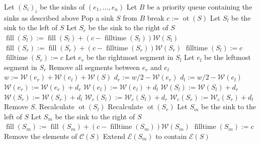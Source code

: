 \documentclass[11pt,a4paper]{article}
\DeclareMathOperator{\ot}{ot}
\DeclareMathOperator{\Fill}{fill}
\DeclareMathOperator{\filltime}{filltime}
\begin{document}
\begin{algorithmic}[1]
    \State Let $(S_i)_i$ be the sinks of $(e_1,\ldots,e_n)$
    \State Let $B$ be a priority queue containing the sinks as described above
     \label{a2:while}
        \State Pop a sink $S$ from $B$  \label{a2:firstline}
        \If{$\ot(S)\ge T$} \label{a2:otget}
            \State break
        \EndIf
        \State $c := \ot(S)$ \label{a2:cupd}
         \label{a2:bleqbr}
            \State Let $S_l$ be the sink to the left of $S$ \label{a2:getsl}
            \State Let $S_r$ be the sink to the right of $S$ \label{a2:getsr}
            \State $\Fill(S_l) := \Fill(S_l) + (c - \filltime(S_l))\mathcal{W}(S_l)$
            \State $\Fill(S_r) := \Fill(S_r) + (c - \filltime(S_r))\mathcal{W}(S_r)$
            \State $\filltime(S_l) := c$
            \State $\filltime(S_r) := c$
            \State Let $e_r$ be the rightmost segment in $S_l$ \label{a2:geter}
            \State Let $e_l$ be the leftmost segment in $S_r$ \label{a2:getel}
            \State Remove all segments between $e_r$ and $e_l$ \label{a2:remerel}
            \State $w := \mathcal{W}(e_r) + \mathcal{W}(e_l) +\mathcal{W}(S)$ \label{a2:defw}
            \State $d_r := w/2 - \mathcal{W}(e_r)$ \label{a2:defdr}
            \State $d_l := w/2 - \mathcal{W}(e_l)$ \label{a2:defdl}
            \State $\mathcal{W}(e_r) := \mathcal{W}(e_r) + d_r$ \label{a2:adlener}
            \State $\mathcal{W}(e_l) := \mathcal{W}(e_l) + d_l$ \label{a2:adlenel}
            \State $\mathcal{W}(S_l) := \mathcal{W}(S_l) + d_r$ \label{a2:adlenls}
            \State $\mathcal{W}(S_r) := \mathcal{W}(S_r) + d_l$ \label{a2:adlenrs}
              \State $\mathcal{W}_c(S_l) := \mathcal{W}_c(S_l) + d_r$ \label{a2:modwcsl}
            \EndIf
              \State $\mathcal{W}_c(S_r) := \mathcal{W}_c(S_r) + d_l$
            \EndIf
            \State Remove $S$. \label{a2:rems}
            \State Recalculate $\ot(S_l)$
            \State Recalculate $\ot(S_r)$
        \Else
              \State Let $S_m$ be the sink to the left of $S$
            \Else
              \State Let $S_m$ be the sink to the right of $S$
            \EndIf
            \State $\Fill(S_m) := \Fill(S_m) + (c - \filltime(S_m))\mathcal{W}(S_m)$
            \State $\filltime(S_m) := c$
            \State Remove the elements of $\mathcal{C}(S)$
            \State Extend $\mathcal{E}(S_m)$ to contain $\mathcal{E}(S)$

\end{algorithmic}
\end{document}
